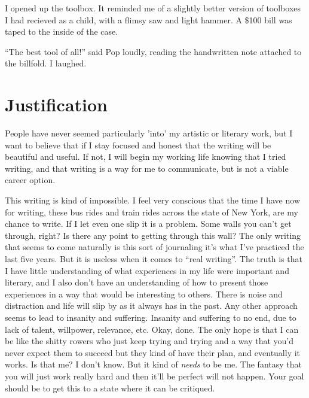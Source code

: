 \documentclass[12pt]{memoir}
\begin{document}
I opened up the toolbox.  It reminded me of a slightly better version of
toolboxes I had recieved as a child, with a flimsy saw and light hammer.  A
\$100 bill was taped to the inside of the case.

``The best tool of all!'' said Pop loudly, reading the handwritten note attached
to the billfold.  I laughed.


\section{}

\chapter{Justification} 

People have never seemed particularly 'into' my artistic or literary work, but I
want to believe that if I stay focused and honest that the writing will be
beautiful and useful.  If not, I will begin my working life knowing that I tried
writing, and that writing is a way for me to communicate, but is not a viable
career option.

This writing is kind of impossible.  I feel very conscious that the time I have
now for writing, these bus rides and train rides across the state of New York,
are my chance to write.  If I let even one slip it is a problem.  Some walls you
can't get through, right?  Is there any point to getting through this wall?  The
only writing that seems to come naturally is this sort of journaling  it's what
I've practiced the last five years.  But it is useless when it comes to ``real
writing''.  The truth is that I have little understanding of what experiences in
my life were important and literary, and I also don't have an understanding of
how to present those experiences in a way that would be interesting to others.
There is noise and distraction and life will slip by as it always has in the
past.  Any other approach seems to lead to insanity and suffering.  Insanity and
suffering to no end, due to lack of talent, willpower, relevance, etc.  Okay,
done.  The only hope is that I can be like the shitty rowers who just keep
trying and trying and a way that you'd never expect them to succeed but they
kind of have their plan, and eventually it works.  Is that me?  I don't know.
But it kind of \textit{needs} to be me.
The fantasy that you will just work really hard and then it'll be perfect will
not happen.  Your goal should be to get this to a state where it can be
critiqued.
\end{document}
